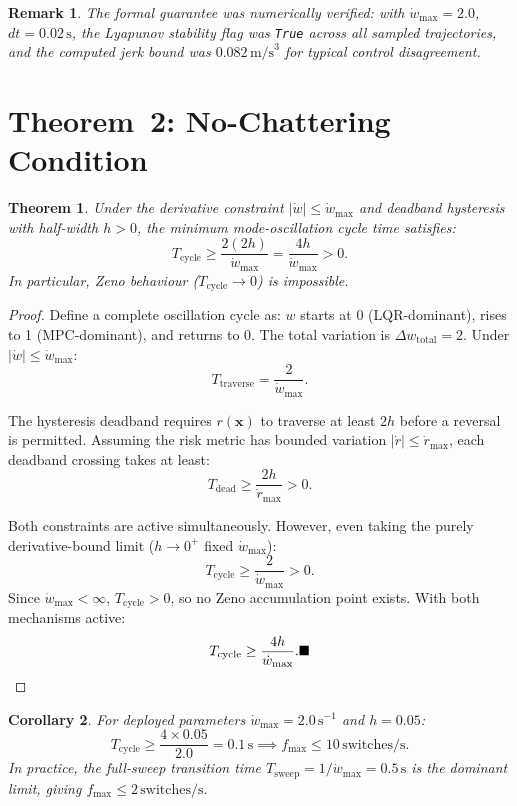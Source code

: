 \documentclass[12pt,a4paper,oneside]{report}
\newtheorem{theorem}{Theorem}[chapter]
\newtheorem{corollary}[theorem]{Corollary}
\newtheorem{remark}{Remark}[chapter]
\begin{document}
\begin{remark}
  The formal guarantee was numerically verified: with
  \(\dot{w}_{\max}=2.0\), \(dt=0.02\,\text{s}\), the Lyapunov stability
  flag was \texttt{True} across all sampled trajectories, and the computed
  jerk bound was \(0.082\,\text{m/s}^3\) for typical control disagreement.
\end{remark}

\section{Theorem~2: No-Chattering Condition}

\begin{theorem}\label{thm:no_chatter}
  Under the derivative constraint \(|\dot{w}|\leq\dot{w}_{\max}\) and
  deadband hysteresis with half-width \(h>0\), the minimum mode-oscillation
  cycle time satisfies:
  \begin{equation}
    T_{\mathrm{cycle}} \geq \frac{2(2h)}{\dot{w}_{\max}} =
    \frac{4h}{\dot{w}_{\max}} > 0.
  \end{equation}
  In particular, Zeno behaviour (\(T_{\mathrm{cycle}}\to 0\)) is impossible.
\end{theorem}

\begin{proof}
  Define a complete oscillation cycle as: \(w\) starts at 0 (LQR-dominant),
  rises to 1 (MPC-dominant), and returns to 0. The total variation is
  \(\Delta w_{\mathrm{total}}=2\). Under \(|\dot{w}|\leq\dot{w}_{\max}\):
  \[T_{\mathrm{traverse}} = \frac{2}{\dot{w}_{\max}}.\]

  The hysteresis deadband requires \(r(\mathbf{x})\) to traverse at least
  \(2h\) before a reversal is permitted. Assuming the risk metric has
  bounded variation \(|\dot{r}|\leq\dot{r}_{\max}\), each deadband crossing
  takes at least:
  \[T_{\mathrm{dead}} \geq \frac{2h}{\dot{r}_{\max}} > 0.\]

  Both constraints are active simultaneously. However, even taking the
  purely derivative-bound limit (\(h\to 0^+\) fixed \(\dot{w}_{\max}\)):
  \[T_{\mathrm{cycle}} \geq \frac{2}{\dot{w}_{\max}} > 0.\]
  Since \(\dot{w}_{\max}<\infty\), \(T_{\mathrm{cycle}}>0\), so no Zeno
  accumulation point exists. With both mechanisms active:
  \[T_{\mathrm{cycle}} \geq \frac{4h}{\dot{w}_{\max}}.\hfill\blacksquare\]
\end{proof}

\begin{corollary}
  For deployed parameters \(\dot{w}_{\max}=2.0\,\text{s}^{-1}\) and
  \(h=0.05\):
  \[T_{\mathrm{cycle}} \geq \frac{4\times0.05}{2.0} = 0.1\,\text{s}
  \implies f_{\max} \leq 10\,\text{switches/s}.\]
  In practice, the full-sweep transition time
  \(T_{\mathrm{sweep}}=1/\dot{w}_{\max}=0.5\,\text{s}\) is the dominant
  limit, giving \(f_{\max}\leq 2\,\text{switches/s}\).
\end{corollary}
\end{document}
